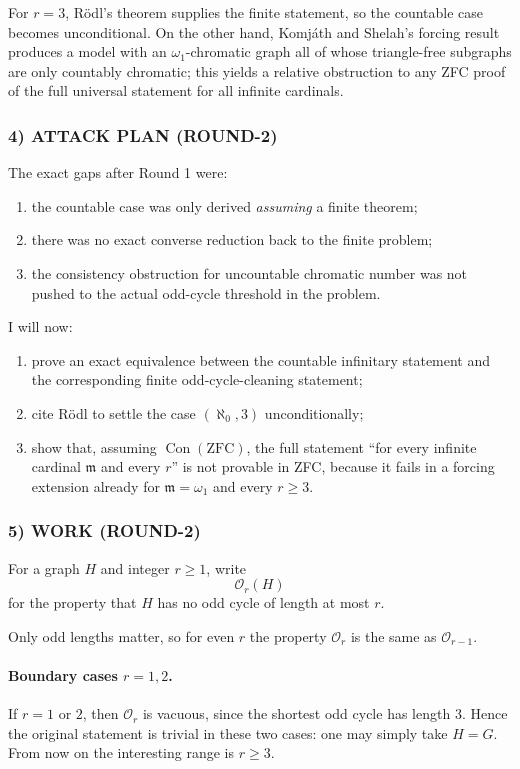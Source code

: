 For $r=3$, Rödl's theorem supplies the finite statement, so the countable case becomes unconditional. On the other hand, Komj\'{a}th and Shelah's forcing result produces a model with an $\omega_1$-chromatic graph all of whose triangle-free subgraphs are only countably chromatic; this yields a relative obstruction to any ZFC proof of the full universal statement for all infinite cardinals.

\subsubsection*{4) ATTACK PLAN (ROUND-2)}
The exact gaps after Round 1 were:

\begin{enumerate}
\item the countable case was only derived \emph{assuming} a finite theorem;
\item there was no exact converse reduction back to the finite problem;
\item the consistency obstruction for uncountable chromatic number was not pushed to the actual odd-cycle threshold in the problem.
\end{enumerate}

I will now:

\begin{enumerate}
\item prove an exact equivalence between the countable infinitary statement and the corresponding finite odd-cycle-cleaning statement;
\item cite Rödl to settle the case $(\aleph_0,3)$ unconditionally;
\item show that, assuming $\operatorname{Con}(\mathrm{ZFC})$, the full statement ``for every infinite cardinal $\mathfrak m$ and every $r$'' is not provable in ZFC, because it fails in a forcing extension already for $\mathfrak m=\omega_1$ and every $r\ge 3$.
\end{enumerate}

\subsubsection*{5) WORK (ROUND-2)}
For a graph $H$ and integer $r\ge 1$, write
\[
\mathcal O_r(H)
\]
for the property that $H$ has no odd cycle of length at most $r$.

Only odd lengths matter, so for even $r$ the property $\mathcal O_r$ is the same as $\mathcal O_{r-1}$.

\paragraph{Boundary cases $r=1,2$.}
If $r=1$ or $2$, then $\mathcal O_r$ is vacuous, since the shortest odd cycle has length $3$. Hence the original statement is trivial in these two cases: one may simply take $H=G$.
From now on the interesting range is $r\ge 3$.

